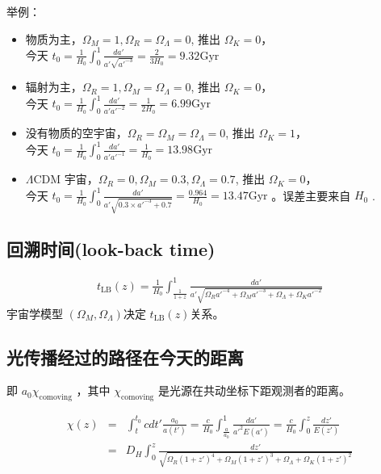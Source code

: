 \documentclass[12pt]{ctexart}
\begin{document}
举例：
\begin{itemize}
    \item 物质为主，$\Omega_M=1, \Omega_R=\Omega_\Lambda=0$, 推出 $\Omega_K=0$，\\今天 $t_0=\frac{1}{H_0}\int_0^1 \frac{da'}{a' \sqrt{a'^{-3}}}=\frac{2}{3 H_0}=9.32 \mathrm{Gyr}$ 
    \item 辐射为主，$\Omega_R=1, \Omega_M=\Omega_\Lambda=0$, 推出 $\Omega_K=0$，\\今天 $t_0=\frac{1}{H_0}\int_0^1 \frac{da'}{a' a'^{-2}}=\frac{1}{2 H_0}=6.99 \mathrm{Gyr}$ 
    \item 没有物质的空宇宙，$\Omega_R=\Omega_M=\Omega_\Lambda=0$, 推出 $\Omega_K=1$，\\今天 $t_0=\frac{1}{H_0}\int_0^1 \frac{da'}{a' a'^{-1}}=\frac{1}{ H_0}=13.98 \mathrm{Gyr}$ 
    \item $\Lambda$CDM 宇宙，$\Omega_R=0, \Omega_M=0.3,\Omega_\Lambda=0.7$, 推出 $\Omega_K=0$，\\今天 $t_0=\frac{1}{H_0}\int_0^1 \frac{da'}{a' \sqrt{0.3\times a'^{-3}+0.7} }=\frac{0.964}{ H_0}=13.47 \mathrm{Gyr}$ 。误差主要来自 $H_0$ .
\end{itemize}

\subsection{回溯时间(look-back time)}
\begin{eqnarray}
    t_\text{LB}(z)  = \frac{1}{H_0}\int_\frac{1}{1+z}^1 \frac{da'}{a' \sqrt{\Omega_R a'^{-4}+\Omega_M a'^{-3}+\Omega_\Lambda+\Omega_K a'^{-2}}}
\end{eqnarray}
宇宙学模型 $\left(\Omega_M, \Omega_\Lambda\right) $决定 $t_\text{LB}(z)$关系。

\subsection{光传播经过的路径在今天的距离}

即 $a_0 \chi_\text{comoving}$ ，其中 $\chi_\text{comoving}$ 是光源在共动坐标下距观测者的距离。 

\begin{eqnarray}
    \chi(z) &=& \int_t^{t_0} cdt' \frac{a_0}{a(t')} = \frac{c}{H_0}\int_{\frac{a}{a_0}}^1 \frac{da'}{a'^2 E(a')} =\frac{c}{H_0}\int_0^z \frac{dz'}{E(z')} \\ 
    &=&  D_H \int_0^z \frac{dz'}{ \sqrt{\Omega_R(1+z')^{4}+\Omega_M(1+z')^{3}+\Omega_\Lambda+\Omega_K(1+z')^{2} }}
\end{eqnarray}
\end{document}
